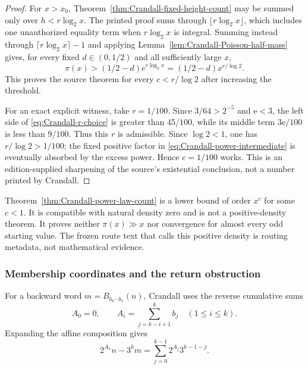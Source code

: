 \begin{proof}
\label{sourceissue:Crandall-theorem61-endpoint}
For $x>x_0$, Theorem~\ref{thm:Crandall-fixed-height-count} may be summed only
over $h<r\log_2x$.  The printed proof sums through
$\lfloor r\log_2x\rfloor$, which includes one unauthorized equality term
when $r\log_2x$ is integral.  Summing instead through
$\lceil r\log_2x\rceil-1$ and applying
Lemma~\ref{lem:Crandall-Poisson-half-mass} gives, for every fixed
$d\in(0,1/2)$ and all sufficiently large $x$,
\begin{equation}
\label{eq:Crandall-power-intermediate}
 \pi(x)>(1/2-d)e^{r\log_2x}
       =(1/2-d)x^{r/\log2}.
\end{equation}
This proves the source theorem for every $c<r/\log2$ after increasing the
threshold.

For an exact explicit witness, take $r=1/100$.  Since
$3/64>2^{-5}$ and $\mathrm e<3$, the left side of
\eqref{eq:Crandall-r-choice} is greater than $45/100$, while its middle term
$3\mathrm e/100$ is less than $9/100$.  Thus this $r$ is admissible.  Since
$\log2<1$, one has $r/\log2>1/100$; the fixed positive factor in
\eqref{eq:Crandall-power-intermediate} is eventually absorbed by the excess
power.  Hence $c=1/100$ works.  This is an edition-supplied sharpening of the
source's existential conclusion, not a number printed by Crandall.
\end{proof}

\begin{nonclaim}
\label{nonclaim:Crandall-no-positive-density}
Theorem~\ref{thm:Crandall-power-law-count} is a lower bound of order $x^c$
for some $c<1$.  It is compatible with natural density zero and is not a
positive-density theorem.  It proves neither $\pi(x)\gg x$ nor convergence
for almost every odd starting value.  The frozen route text that calls this
positive density is routing metadata, not mathematical evidence.
\end{nonclaim}

\subsubsection{Membership coordinates and the return obstruction}

For a backward word $m=B_{b_k\cdots b_1}(n)$, Crandall uses the reverse
cumulative sums
\begin{equation}
\label{eq:Crandall-source-A-coordinates}
 A_0=0,
 \qquad
 A_i=\sum_{j=k-i+1}^{k}b_j\quad(1\leq i\leq k).
\end{equation}
Expanding the affine composition gives
\begin{equation}
\label{eq:Crandall-membership-identity}
 2^{A_k}n-3^km
 =\sum_{j=0}^{k-1}2^{A_j}3^{k-1-j}.
\end{equation}

